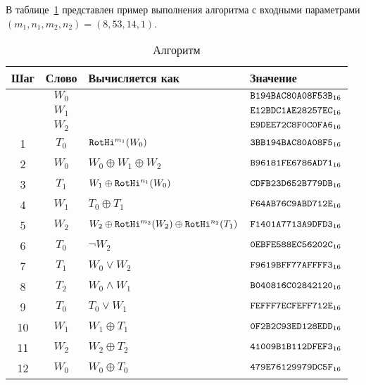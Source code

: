 \label{TEST.S}

В таблице~\ref{Table.TEST.S} представлен пример выполнения
алгоритма  с входными параметрами
$(m_1,n_1,m_2,n_2)=(8,53,14,1)$.

\begin{table}[H]
\caption{Алгоритм }\label{Table.TEST.S}
\begin{tabular}{|c|c|l|l|}
\hline
Шаг & Слово & Вычисляется как & Значение\\
\hline
\hline
    & $W_0$ & &
$\texttt{B194BAC80A08F53B}_{16}$\\
    & $W_1$ & &
$\texttt{E12BDC1AE28257EC}_{16}$\\
    & $W_2$ & &
$\texttt{E9DEE72C8F0C0FA6}_{16}$\\
%
1   & $T_0$ & $\mathop{\texttt{RotHi}}\nolimits^{m_1}(W_0)$ & 
$\texttt{3BB194BAC80A08F5}_{16}$\\
2   & $W_0$ & $W_0\oplus W_1\oplus W_2$ & 
$\texttt{B96181FE6786AD71}_{16}$\\
3   & $T_1$ & $W_1\oplus \mathop{\texttt{RotHi}}\nolimits^{n_1}(W_0)$ & 
$\texttt{CDFB23D652B779DB}_{16}$\\
4   & $W_1$ & $T_0\oplus T_1$ & 
$\texttt{F64AB76C9ABD712E}_{16}$\\
5   & $W_2$ & $W_2\oplus\mathop{\texttt{RotHi}}\nolimits^{m_2}(W_2)\oplus\mathop{\texttt{RotHi}}\nolimits^{n_2}(T_1)$ & 
$\texttt{F1401A7713A9DFD3}_{16}$\\
6   & $T_0$ & $\neg W_2$ & 
$\texttt{0EBFE588EC56202C}_{16}$\\
7   & $T_1$ & $W_0\vee W_2$ & 
$\texttt{F9619BFF77AFFFF3}_{16}$\\
8   & $T_2$ & $W_0\wedge W_1$ & 
$\texttt{B040816C02842120}_{16}$\\
9   & $T_0$ & $T_0\vee W_1$ & 
$\texttt{FEFFF7ECFEFF712E}_{16}$\\
10  & $W_1$ & $W_1\oplus T_1$ & 
$\texttt{0F2B2C93ED128EDD}_{16}$\\
11  & $W_2$ & $W_2\oplus T_2$ & 
$\texttt{41009B1B112DFEF3}_{16}$\\
12  & $W_0$ & $W_0\oplus T_0$ & 
$\texttt{479E76129979DC5F}_{16}$\\
\hline
\end{tabular}
\end{table}

